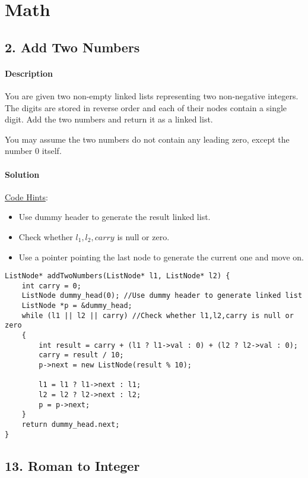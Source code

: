 \section{Math}

\subsection{2. Add Two Numbers}

\paragraph{Description}

You are given two non-empty linked lists representing two non-negative integers. The digits are stored in reverse order and each of their nodes contain a single digit. Add the two numbers and return it as a linked list.

You may assume the two numbers do not contain any leading zero, except the number 0 itself.

\paragraph{Solution}

\underline{Code Hints}:
\begin{itemize}
    \item Use dummy header to generate the result linked list.
    \item Check whether $l_1,l_2,carry$ is null or zero.
    \item Use a pointer pointing the last node to generate the current one and move on.
\end{itemize}

\begin{verbatim}
ListNode* addTwoNumbers(ListNode* l1, ListNode* l2) {
    int carry = 0;
    ListNode dummy_head(0); //Use dummy header to generate linked list
    ListNode *p = &dummy_head;
    while (l1 || l2 || carry) //Check whether l1,l2,carry is null or zero
    {
        int result = carry + (l1 ? l1->val : 0) + (l2 ? l2->val : 0);
        carry = result / 10;
        p->next = new ListNode(result % 10);
        
        l1 = l1 ? l1->next : l1;
        l2 = l2 ? l2->next : l2;
        p = p->next;
    }
    return dummy_head.next;
}
\end{verbatim}

\subsection{13. Roman to Integer}


